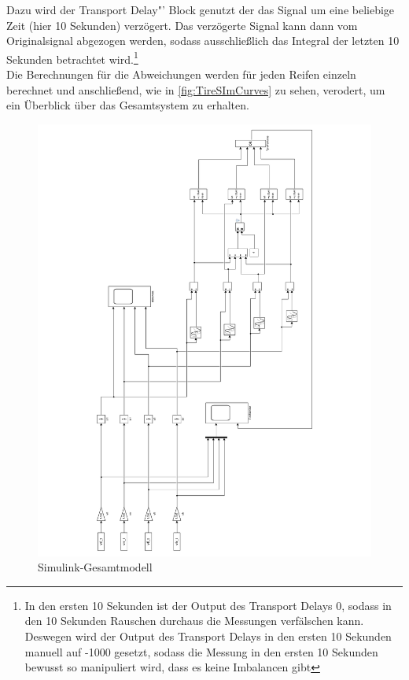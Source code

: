 Dazu wird der  \glqq Transport Delay"' Block genutzt der das Signal um eine beliebige Zeit (hier 10 Sekunden) verzögert. Das verzögerte Signal kann dann vom Originalsignal abgezogen werden, sodass ausschließlich das Integral der letzten 10 Sekunden betrachtet wird.\footnote{In den ersten 10 Sekunden ist der Output des Transport Delays 0, sodass in den 10 Sekunden Rauschen durchaus die Messungen verfälschen kann. Deswegen wird der Output des Transport Delays in den ersten 10 Sekunden manuell auf -1000 gesetzt, sodass die Messung in den ersten 10 Sekunden bewusst so manipuliert wird, dass es keine Imbalancen gibt }\\
Die Berechnungen für die Abweichungen werden für jeden Reifen einzeln berechnet und anschließend, wie in \autoref{fig:TireSImCurves} zu sehen, verodert, um ein Überblick über das Gesamtsystem zu erhalten.\\


\begin{figure}[H]
	\centering
	\includegraphics[height=0.95\textheight]{../Graphiken/TireSimCurvesLandscape.pdf}
	\caption{Simulink-Gesamtmodell}
	\label{fig:TireSImCurves}
\end{figure}



